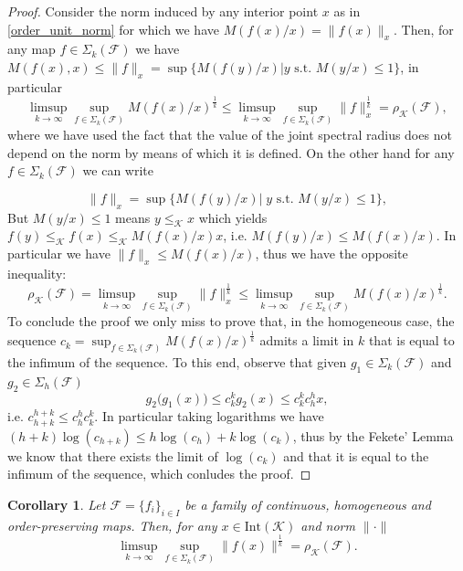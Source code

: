 \documentclass{article}
\newtheorem{corollary}[theorem]{Corollary}
\newcommand{\family}{\mathcal{F}}
\newcommand{\cradius}{\rho_{\cone}}
\newcommand{\cone}{\mathcal{K}}
\newcommand{\interior}{\mathrm{Int}}
\newcommand{\cleq}{\leq_{\cone}}
\begin{document}
\begin{proof}
Consider the norm induced by any interior point $x$ as in \eqref{order_unit_norm} for which we have $M(f(x)/x)=\|f(x)\|_x$. 
%
Then, for any map $f\in \Sigma_k(\family)$ we have $M(f(x),x)\leq \|f\|_x=\sup\{ M(f(y)/x)|y \text{ s.t. }M(y/x)\leq 1\}$, in particular 
%
\begin{equation}
    \limsup_{k\rightarrow \infty}\sup_{f\in \Sigma_k(\family)}M(f(x)/x)^{\frac{1}{k}}\leq \limsup_{k\rightarrow \infty}\sup_{f\in \Sigma_k(\family)}\|f\|_x^{\frac{1}{k}}= \cradius(\family),
\end{equation}
%
where we have used the fact that the value of the joint spectral radius does not depend on the norm by means of which it is defined.
%
On the other hand for any $f\in \Sigma_k(\family)$ we can write 

\begin{equation}
\|f\|_x=\sup\{M(f(y)/x)|\; y \text{ s.t. } M(y/x)\leq 1\},
\end{equation}
%
But $M(y/x)\leq 1$ means $y\cleq x$ which yields $f(y)\cleq f(x)\cleq M(f(x)/x)x$, i.e. $M(f(y)/x)\leq M(f(x)/x)$. In particular we have $\|f\|_x\leq M(f(x)/x)$, thus we have the opposite inequality:
%
\begin{equation}
\cradius(\family)=\limsup_{k\rightarrow \infty}\sup_{f\in \Sigma_k(\family)}\|f\|_x^{\frac{1}{k}}\leq \limsup_{k\rightarrow \infty}\sup_{f\in \Sigma_k(\family)}M(f(x)/x)^{\frac{1}{k}}.
\end{equation}
%
To conclude the proof we only miss to prove that, in the homogeneous case, the sequence $c_k=\sup_{f\in \Sigma_k(\family)}M(f(x)/x)^{\frac{1}{k}}$ admits a limit in $k$ that is equal to the infimum of the sequence.
To this end, observe that given $g_1\in \Sigma_k(\family)$ and $g_2\in \Sigma_h(\family)$
%
\begin{equation}
   g_2\big(g_1(x)\big)\leq c_k^k g_2(x) \leq c_k^k c_h^h x , 
\end{equation}
i.e. $c_{h+k}^{h+k}\leq c_h^h c_k^k$. In particular taking logarithms we have 
$(h+k)\log(c_{h+k})\leq h \log(c_h)+k\log(c_k)$, thus by the Fekete' Lemma we know that there exists the limit of $\log(c_k)$ and that it is equal to the infimum of the sequence, which conludes the proof. 
\end{proof}
%
%
\begin{corollary}\label{Cor:power_method_representation_joint_spectral_radius}
    Let $\family=\{f_i\}_{i\in I}$ be a family of continuous, homogeneous and order-preserving maps. Then, for any $x\in \interior(\cone)$ and norm $\|\cdot\|$
    $$\limsup_{k\rightarrow \infty}\sup_{f\in \Sigma_k(\family)}\|f(x)\|^{\frac{1}{k}}=\cradius(\family).$$
\end{corollary}
\end{document}
